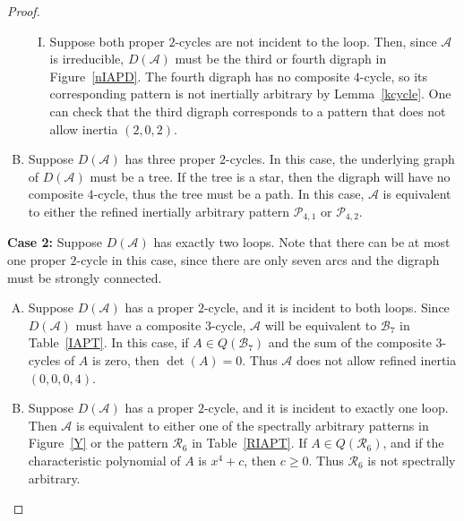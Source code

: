 \documentclass[10pt]{amsart}
\begin{document}
\begin{proof}
\begin{enumerate}[(A)]
\begin{enumerate}[(I)]
			\item Suppose both proper $2$-cycles are not incident to the loop. Then, since
			${\mathcal{A}}$ is irreducible, $D({\mathcal{A}})$ must be the third or fourth digraph 
			in Figure~\ref{nIAPD}. The fourth digraph has no composite
			 $4$-cycle, so its corresponding pattern is not inertially arbitrary
			 by Lemma~\ref{kcycle}. One can check that
			 the third digraph corresponds to a pattern that  does not allow inertia $(2, 0, 2)$.
			
				
		\end{enumerate}
		\item Suppose $D({\mathcal{A}})$ has three proper $2$-cycles. In this case, the underlying graph of 
		$D({\mathcal{A}})$ must be a tree. If the tree is a star, then the digraph will
		have no composite $4$-cycle, thus the tree must be a path. In this case,
		${\mathcal{A}}$ is equivalent to either the refined inertially arbitrary 
		pattern ${\mathcal{P}}_{4,1}$ or ${\mathcal{P}}_{4,2}$.
		
	\end{enumerate}
	\textbf{Case 2:} Suppose $D({\mathcal{A}})$ has exactly two loops. Note that there can be at most one proper $2$-cycle in this case, 
	 since there are only seven arcs and the digraph must be strongly connected. 
	\begin{enumerate}[(A)]
		\item Suppose $D({\mathcal{A}})$ has a proper $2$-cycle, and it is incident to both loops.
		Since $D({\mathcal{A}})$ must have a composite $3$-cycle, ${\mathcal{A}}$ will
		be equivalent to ${\mathcal{B}}_7$ in Table~\ref{IAPT}. In this
		case, if $A\in Q({\mathcal{B}}_7)$ and the sum of the composite $3$-cycles of $A$ is zero, 
		then $\det(A)=0$. Thus ${\mathcal{A}}$ does not allow refined inertia $(0,0,0,4)$.
				
		\item Suppose $D({\mathcal{A}})$ has a proper $2$-cycle, and it is incident to exactly one loop. Then ${\mathcal{A}}$ is equivalent to either
		one of the spectrally arbitrary patterns in Figure~\ref{Y} or the 
		pattern ${\mathcal{R}}_6$ in Table~\ref{RIAPT}. If  $A\in Q({\mathcal{R}}_6)$, and if the characteristic polynomial
		of $A$ is $x^4+c$, then $c\geq 0$. Thus ${\mathcal{R}}_6$ is not spectrally arbitrary.  
		

\end{enumerate}
\end{proof}
\end{document}
